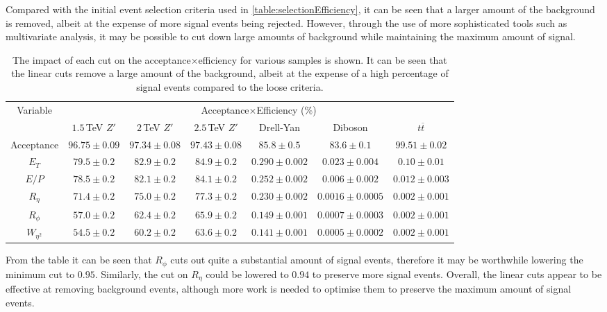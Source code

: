 \documentclass{article}
\begin{document}
Compared with the initial event selection criteria used in \ref{table:selectionEfficiency}, it can be seen that a larger amount of the background is removed, albeit at the expense of more signal events being rejected. However, through the use of more sophisticated tools such as multivariate analysis, it may be possible to cut down large amounts of background while maintaining the maximum amount of signal.

\begin{table}[h!t]
\centering
\caption{The impact of each cut on the acceptance$\times$efficiency for various samples is shown. It can be seen that the linear cuts remove a large amount of the background, albeit at the expense of a high percentage of signal events compared to the loose criteria. \label{table:linearCutEfficiencies}}
\begin{tabular}{|c|c|c|c|c|c|c| } 
\hline
\multirow{2}{*}{Variable} & \multicolumn{6}{|c|}{Acceptance$\times$Efficiency ($\%$)}\\\cline{2-7}
& $1.5\,$TeV $Z'$ & $2\,$TeV $Z'$ & $2.5\,$TeV $Z'$ & Drell-Yan & Diboson & $t\overline{t}$ \\\hline
Acceptance &	$96.75\pm0.09$ & 	$97.34\pm0.08$ & 	$97.43\pm0.08$ & 	$85.8\pm0.5$ & 	$83.6\pm0.1$ & 	$99.51\pm0.02$ 	\\\hline
$E_T$ &	$79.5\pm0.2$ & 	$82.9\pm0.2$ & 	$84.9\pm0.2$ & 	$0.290\pm0.002$ & 	$0.023\pm0.004$ & 	$0.10\pm0.01$ 	\\\hline
$E/P$ &	$78.5\pm0.2$ & 	$82.1\pm0.2$ & 	$84.1\pm0.2$ & 	$0.252\pm0.002$ & 	$0.006\pm0.002$ & 	$0.012\pm0.003$ 	\\\hline
$R_{\eta}$ &	$71.4\pm0.2$ & 	$75.0\pm0.2$ & 	$77.3\pm0.2$ & 	$0.230\pm0.002$ & 	$0.0016\pm0.0005$ & 	$0.002\pm0.001$ 	\\\hline
$R_{\phi}$ &	$57.0\pm0.2$ & 	$62.4\pm0.2$ & 	$65.9\pm0.2$ & 	$0.149\pm0.001$ & 	$0.0007\pm0.0003$ & 	$0.002\pm0.001$ 	\\\hline
$W_{\eta^2}$ &	$54.5\pm0.2$ & 	$60.2\pm0.2$ & 	$63.6\pm0.2$ & 	$0.141\pm0.001$ & 	$0.0005\pm0.0002$ & 	$0.002\pm0.001$ 	\\\hline\end{tabular}
\end{table}

From the table it can be seen that $R_{\phi}$ cuts out quite a substantial amount of signal events, therefore it may be worthwhile lowering the minimum cut to $0.95$. Similarly, the cut on $R_{\eta}$ could be lowered to $0.94$ to preserve more signal events. Overall, the linear cuts appear to be effective at removing background events, although more work is needed to optimise them to preserve the maximum amount of signal events.
\end{document}
